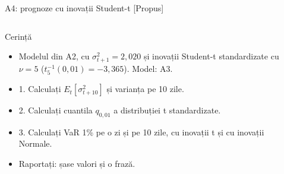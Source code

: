 \begin{frame}{A4: prognoze cu inovații Student-t [Propus]}
\propsub
\itemsize{\scriptsize}
\begin{columns}[T]
\begin{column}{\taskw}
\begin{block}{Cerință}
\begin{itemize}
    \item Modelul din A2, cu $\sigma_{t+1}^2 = 2{,}020$ și inovații Student-t standardizate cu $\nu = 5$ ($t_5^{-1}(0{,}01) = -3{,}365$). Model: A3.
    \item 1. Calculați $E_t[\sigma_{t+10}^2]$ și varianța pe 10 zile.
    \item 2. Calculați cuantila $q_{0{,}01}$ a distribuției t standardizate.
    \item 3. Calculați VaR 1\% pe o zi și pe 10 zile, cu inovații t și cu inovații Normale.
    \item Raportați: șase valori și o frază.
\end{itemize}
\end{block}
\end{column}
\begin{column}{\solw}
\end{column}
\end{columns}
\end{frame}

